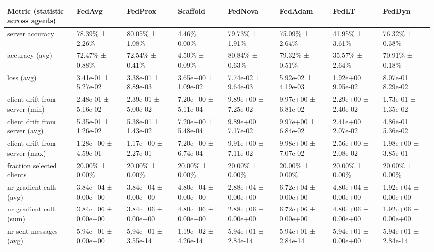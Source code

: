 \begin{tabular}{llllllll}
\hline
 Metric (statistic across agents)   & FedAvg              & FedProx             & Scaffold            & FedNova             & FedAdam             & FedLT               & FedDyn              \\
\hline
 server accuracy                    & 78.39\% ± 2.26\%      & 80.05\% ± 1.08\%      & 4.46\% ± 0.00\%       & 79.73\% ± 1.91\%      & 75.09\% ± 2.64\%      & 41.95\% ± 3.61\%      & 76.32\% ± 0.38\%      \\
 accuracy (avg)                     & 72.47\% ± 0.88\%      & 72.54\% ± 0.41\%      & 4.50\% ± 0.09\%       & 80.84\% ± 0.63\%      & 79.32\% ± 0.51\%      & 35.57\% ± 2.64\%      & 70.91\% ± 0.18\%      \\
 loss (avg)                         & 3.41e-01 ± 5.27e-02 & 3.38e-01 ± 8.89e-03 & 3.65e+00 ± 1.09e-02 & 7.74e-02 ± 9.64e-03 & 5.92e-02 ± 4.19e-03 & 1.92e+00 ± 9.95e-02 & 8.07e-01 ± 8.29e-02 \\
 client drift from server (min)     & 2.48e-01 ± 5.16e-02 & 2.39e-01 ± 5.00e-02 & 7.20e+00 ± 5.11e-04 & 9.89e+00 ± 7.25e-02 & 9.97e+00 ± 6.81e-02 & 2.29e+00 ± 2.40e-02 & 1.73e-01 ± 1.35e-02 \\
 client drift from server (avg)     & 5.35e-01 ± 1.26e-02 & 5.38e-01 ± 1.43e-02 & 7.20e+00 ± 5.48e-04 & 9.89e+00 ± 7.17e-02 & 9.97e+00 ± 6.84e-02 & 2.41e+00 ± 2.07e-02 & 4.86e-01 ± 5.36e-02 \\
 client drift from server (max)     & 1.28e+00 ± 4.59e-01 & 1.17e+00 ± 2.27e-01 & 7.20e+00 ± 6.74e-04 & 9.91e+00 ± 7.11e-02 & 9.98e+00 ± 7.07e-02 & 2.56e+00 ± 2.08e-02 & 1.98e+00 ± 3.85e-01 \\
 fraction selected clients          & 20.00\% ± 0.00\%      & 20.00\% ± 0.00\%      & 20.00\% ± 0.00\%      & 20.00\% ± 0.00\%      & 20.00\% ± 0.00\%      & 20.00\% ± 0.00\%      & 20.00\% ± 0.00\%      \\
 nr gradient calls (avg)            & 3.84e+04 ± 0.00e+00 & 3.84e+04 ± 0.00e+00 & 4.80e+04 ± 0.00e+00 & 2.88e+04 ± 0.00e+00 & 6.72e+04 ± 0.00e+00 & 4.80e+04 ± 0.00e+00 & 1.92e+04 ± 0.00e+00 \\
 nr gradient calls (sum)            & 3.84e+06 ± 0.00e+00 & 3.84e+06 ± 0.00e+00 & 4.80e+06 ± 0.00e+00 & 2.88e+06 ± 0.00e+00 & 6.72e+06 ± 0.00e+00 & 4.80e+06 ± 0.00e+00 & 1.92e+06 ± 0.00e+00 \\
 nr sent messages (avg)             & 5.94e+01 ± 0.00e+00 & 5.94e+01 ± 3.55e-14 & 1.19e+02 ± 4.26e-14 & 5.94e+01 ± 2.84e-14 & 5.94e+01 ± 2.84e-14 & 5.94e+01 ± 0.00e+00 & 5.94e+01 ± 2.84e-14 \\

\end{tabular}
